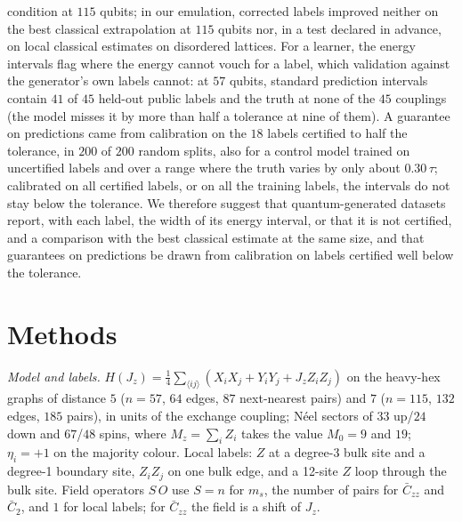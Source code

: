 \documentclass[aps,prx,twocolumn,10pt,superscriptaddress,nofootinbib,longbibliography,floatfix]{revtex4-2}
\theoremstyle{remark}
\newcommand{\Jz}{J_z}
\newcommand{\ms}{m_s}
\newcommand{\Czz}{\bar C_{zz}}
\newcommand{\Ctwo}{\bar C_{2}}
\begin{document}
condition at $115$ qubits; in our emulation, corrected labels improved neither on the best classical extrapolation %
at $115$ qubits nor, in a test declared in advance, on local classical estimates on disordered lattices. For a %
learner, the energy intervals flag where the energy cannot vouch for a label, which validation against the
generator's own labels cannot: at $57$ qubits, standard prediction intervals contain $41$ of $45$ held-out public %
labels and the truth at none of the $45$ couplings (the model misses it by more than half a tolerance at nine of %
them).
A guarantee on predictions came from calibration on the $18$ labels certified to half the tolerance, in $200$ of $200$ random splits, %
also for a control model trained on uncertified labels and over a range where the truth varies by only about $0.30\,\tau$; %
calibrated on all certified labels, or on all the training labels, the intervals do not stay below the tolerance.
We therefore suggest
that quantum-generated datasets report, with each label, the width of its energy interval, or that it is not
certified, and a comparison with the best classical estimate at the same size, and that guarantees on predictions
be drawn from calibration on labels certified well below the tolerance.

\section{Methods}
\label{sec:methods}

\emph{Model and labels.} $H(\Jz)=\frac14\sum_{\langle ij\rangle}(X_iX_j+Y_iY_j+\Jz Z_iZ_j)$ on the heavy-hex graphs of
distance $5$ ($n=57$, $64$ edges, $87$ next-nearest pairs) and $7$ ($n=115$, $132$ edges, $185$ pairs), in units of the %
exchange coupling; N\'eel sectors of $33$ up/$24$ down and $67$/$48$ spins, where $M_z=\sum_iZ_i$ takes the value %
$M_0=9$ and $19$; $\eta_i=+1$ on the majority colour. Local labels: %
$Z$ at a degree-3 bulk site and a degree-1 boundary site, $Z_iZ_j$ on one bulk edge, and a 12-site $Z$ loop through the %
bulk site. Field operators $S\,O$ use $S=n$ for $\ms$, the number of pairs for $\Czz$ and $\Ctwo$, and $1$ for local %
labels; for $\Czz$ the field is a shift of $\Jz$.
\end{document}
